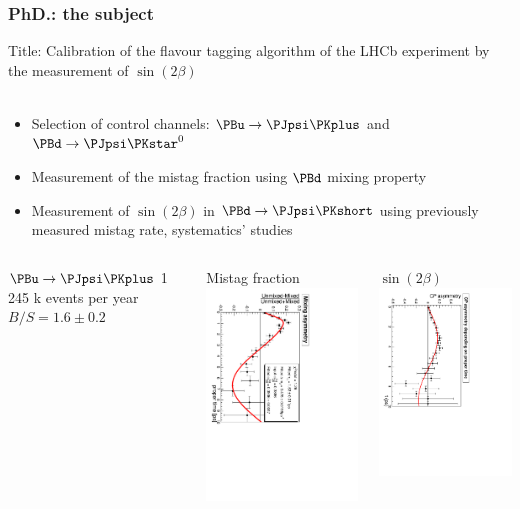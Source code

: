 \documentclass{beamer}
\begin{document}
\begin{frame}
\frametitle{PhD.: the subject}
Title: Calibration of the flavour tagging algorithm of the LHCb experiment by
the measurement of $\sin(2\beta)$\\
~\\
\begin{itemize}
  \item Selection of control channels: $\PBu\to\PJpsi\PKplus$ and
  $\PBd\to\PJpsi\PKstar^0$
  \item Measurement of the mistag fraction using $\PBd$ mixing property
  \item Measurement of $\sin(2\beta)$ in $\PBd\to\PJpsi\PKshort$ using
  previously measured mistag rate, systematics' studies
\end{itemize}
\begin{columns}[t]
\begin{column}[T]{4cm}
\begin{block}{$\PBu\to\PJpsi\PKplus$}
1\,245 k events per year\\
$B/S = 1.6\pm0.2$
\end{block}
\end{column}
\begin{column}[T]{4cm}
\begin{block}{Mistag fraction}
\includegraphics[angle=90,width=4cm]{CombinedAsymFit}
\end{block}
\end{column}
\begin{column}[T]{4cm}
\begin{block}{$\sin(2\beta)$}
\includegraphics[angle=90,width=4cm]{AsymCPDC06AverageOmega}
\end{block}
\end{column}
\end{columns}
\end{frame}
\end{document}

